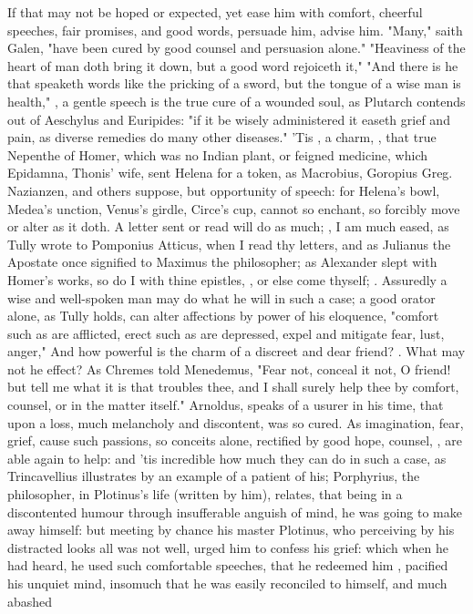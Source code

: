 {If that may not be hoped or expected, yet ease him with comfort, cheerful speeches, fair promises, and good words, persuade him, advise him. "Many," saith Galen, "have been cured by good counsel and persuasion alone." "Heaviness of the heart of man doth bring it down, but a good word rejoiceth it,"  "And there is he that speaketh words like the pricking of a sword, but the tongue of a wise man is health,"  , a gentle speech is the true cure of a wounded soul, as Plutarch contends out of Aeschylus and Euripides: "if it be wisely administered it easeth grief and pain, as diverse remedies do many other diseases." 'Tis , a charm, , that true Nepenthe of Homer, which was no Indian plant, or feigned medicine, which Epidamna, Thonis' wife, sent Helena for a token, as Macrobius,  Goropius  Greg. Nazianzen, and others suppose, but opportunity of speech: for Helena's bowl, Medea's unction, Venus's girdle, Circe's cup, cannot so enchant, so forcibly move or alter as it doth. A letter sent or read will do as much; , I am much eased, as Tully wrote to Pomponius Atticus, when I read thy letters, and as Julianus the Apostate once signified to Maximus the philosopher; as Alexander slept with Homer's works, so do I with thine epistles, , or else come thyself; . Assuredly a wise and well-spoken man may do what he will in such a case; a good orator alone, as Tully holds, can alter affections by power of his eloquence, "comfort such as are afflicted, erect such as are depressed, expel and mitigate fear, lust, anger," \etc{} And how powerful is the charm of a discreet and dear friend? . What may not he effect? As Chremes told Menedemus, "Fear not, conceal it not, O friend! but tell me what it is that troubles thee, and I shall surely help thee by comfort, counsel, or in the matter itself." Arnoldus,  speaks of a usurer in his time, that upon a loss, much melancholy and discontent, was so cured. As imagination, fear, grief, cause such passions, so conceits alone, rectified by good hope, counsel, \etc{}, are able again to help: and 'tis incredible how much they can do in such a case, as Trincavellius illustrates by an example of a patient of his; Porphyrius, the philosopher, in Plotinus's life (written by him), relates, that being in a discontented humour through insufferable anguish of mind, he was going to make away himself: but meeting by chance his master Plotinus, who perceiving by his distracted looks all was not well, urged him to confess his grief: which when he had heard, he used such comfortable speeches, that he redeemed him , pacified his unquiet mind, insomuch that he was easily reconciled to himself, and much abashed }
